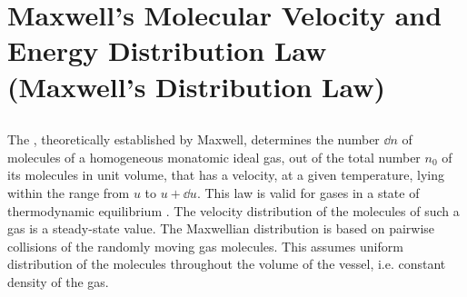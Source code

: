 \section[Maxwell's Distribution Law]{Maxwell's Molecular Velocity and Energy Distribution Law (Maxwell's Distribution Law)}
\label{sec-10.3}


\subsection{}\label{10.3.1} The , theoretically established by Maxwell, determines the number $\dd n$ of molecules of a homogeneous monatomic ideal gas, out of the total number $n_{0}$ of its molecules in unit volume, that has a velocity, at a given temperature, lying within the range from $u$ to $u + \dd u$. This law is valid for gases in a state of thermodynamic equilibrium . The velocity distribution of the molecules of such a gas is a steady-state value. The Maxwellian distribution is based on pairwise collisions of the randomly moving gas molecules. This assumes uniform distribution of the molecules throughout the volume of the vessel, i.e. constant density of the gas.

